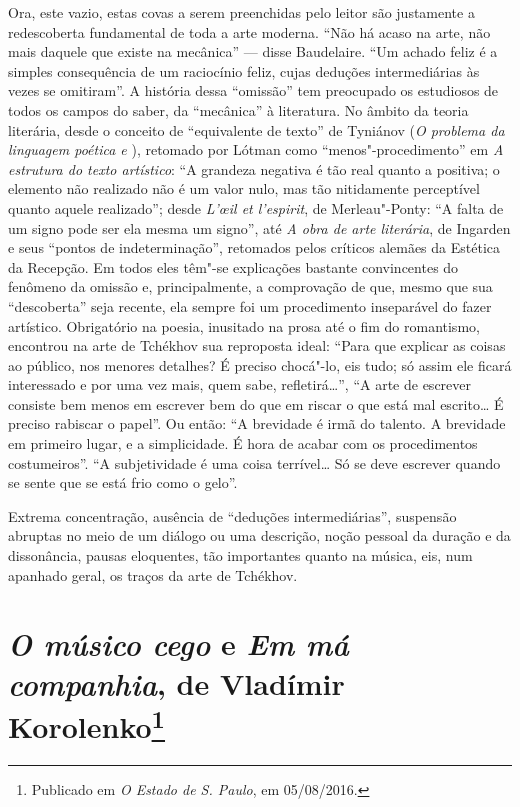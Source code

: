 Ora, este vazio, estas covas a serem preenchidas pelo leitor são
justamente a redescoberta fundamental de toda a arte moderna. ``Não há
acaso na arte, não mais daquele que existe na mecânica'' --- disse
Baudelaire. ``Um achado feliz é a simples consequência de um raciocínio
feliz, cujas deduções intermediárias às vezes se omitiram''. A história
dessa ``omissão'' tem preocupado os estudiosos de todos os campos do
saber, da ``mecânica'' à literatura. No âmbito da teoria literária,
desde o conceito de ``equivalente de texto'' de Tyniánov (\emph{O
problema da linguagem poética  e }), retomado por Lótman como
``menos"-procedimento'' em \emph{A estrutura do texto artístico}: ``A
grandeza negativa é tão real quanto a positiva; o elemento não realizado
não é um valor nulo, mas tão nitidamente perceptível quanto aquele
realizado''; desde \emph{L'œil et l'espirit}, de Merleau"-Ponty: ``A
falta de um signo pode ser ela mesma um signo'', até \emph{A obra de
arte literária}, de Ingarden e seus ``pontos de indeterminação'',
retomados pelos críticos alemães da Estética da Recepção. Em todos eles têm"-se
explicações bastante convincentes do fenômeno da omissão e, principalmente, a
comprovação de que, mesmo que sua ``descoberta'' seja recente, ela
sempre foi um procedimento inseparável do fazer artístico. Obrigatório
na poesia, inusitado na prosa até o fim do romantismo, encontrou na arte
de Tchékhov sua reproposta ideal: ``Para que explicar as coisas ao
público, nos menores detalhes? É preciso chocá"-lo, eis tudo; só assim
ele ficará interessado e por uma vez mais, quem sabe, refletirá\ldots{}'', ``A
arte de escrever consiste bem menos em escrever bem do que em riscar o
que está mal escrito\ldots{} É preciso rabiscar o papel''. Ou então: ``A
brevidade é irmã do talento. A brevidade em primeiro lugar, e a
simplicidade. É hora de acabar com os procedimentos costumeiros''. ``A
subjetividade é uma coisa terrível\ldots{} Só se deve escrever quando se
sente que se está frio como o gelo''.

Extrema concentração, ausência de ``deduções intermediárias'', suspensão
abruptas no meio de um diálogo ou uma descrição, noção pessoal da
duração e da dissonância, pausas eloquentes, tão importantes quanto na
música, eis, num apanhado geral, os traços da arte de Tchékhov.

\chapter{\emph{O músico cego} e \emph{Em má companhia}, de Vladímir
Korolenko\footnote{Publicado em \emph{O Estado de S. Paulo}, em
  05/08/2016.}}

